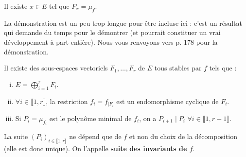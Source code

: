 
	\begin{lemma}
		\label{invariants-de-similitude-2}
		Il existe $x \in E$ tel que $P_x = \mu_f$.
	\end{lemma}

	\begin{remark}
		La démonstration est un peu trop longue pour être incluse ici : c'est un résultat qui demande du temps pour le démontrer (et pourrait constituer un vrai développement à part entière). Nous vous renvoyons vers \cite{[GOU21]} p. 178 pour la démonstration.
	\end{remark}

	\begin{theorem}[Frobenius]
		Il existe des sous-espaces vectoriels $F_1, \dots, F_r$ de $E$ tous stables par $f$ tels que :
		\begin{enumerate}[(i)]
			\item $E = \bigoplus_{i = 1}^r F_i$.
			\item $\forall i \in \llbracket 1, r \rrbracket$, la restriction $f_i = f_{|F_i}$ est un endomorphisme cyclique de $F_i$.
			\item Si $P_i = \mu_{f_i}$ est le polynôme minimal de $f_i$, on a $P_{i+1} \mid P_i$ $\forall i \in \llbracket 1, r-1 \rrbracket$.
		\end{enumerate}
		La suite $(P_i)_{i \in \llbracket 1, r \rrbracket}$ ne dépend que de $f$ et non du choix de la décomposition (elle est donc unique). On l'appelle \textbf{suite des invariants de $f$}.
	\end{theorem}


